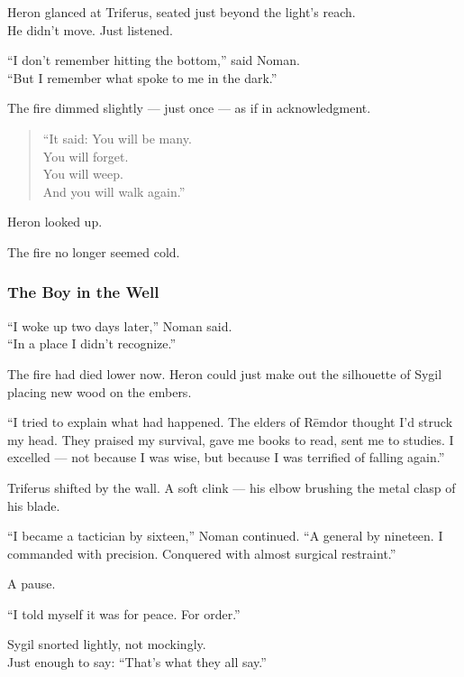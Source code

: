 \documentclass[12pt]{article}
\begin{document}
Heron glanced at Triferus, seated just beyond the light’s reach.\\
He didn’t move. Just listened.

“I don’t remember hitting the bottom,” said Noman.\\
“But I remember what spoke to me in the dark.”

The fire dimmed slightly — just once — as if in acknowledgment.

\begin{quote}
“It said: You will be many.\\
You will forget.\\
You will weep.\\
And you will walk again.”
\end{quote}

Heron looked up.

The fire no longer seemed cold.

\dotfill

\subsubsection*{The Boy in the Well}

“I woke up two days later,” Noman said.\\
“In a place I didn’t recognize.”

The fire had died lower now. Heron could just make out the silhouette of Sygil placing new wood on the embers.

“I tried to explain what had happened. The elders of Rēmdor thought I’d struck my head. They praised my survival, gave me books to read, sent me to studies. I excelled — not because I was wise, but because I was terrified of falling again.”

\vspace{1em}

Triferus shifted by the wall. A soft clink — his elbow brushing the metal clasp of his blade.

“I became a tactician by sixteen,” Noman continued. “A general by nineteen. I commanded with precision. Conquered with almost surgical restraint.”

A pause.

“I told myself it was for peace. For order.”

Sygil snorted lightly, not mockingly.\\
Just enough to say: “That’s what they all say.”

\vspace{1em}
\end{document}
